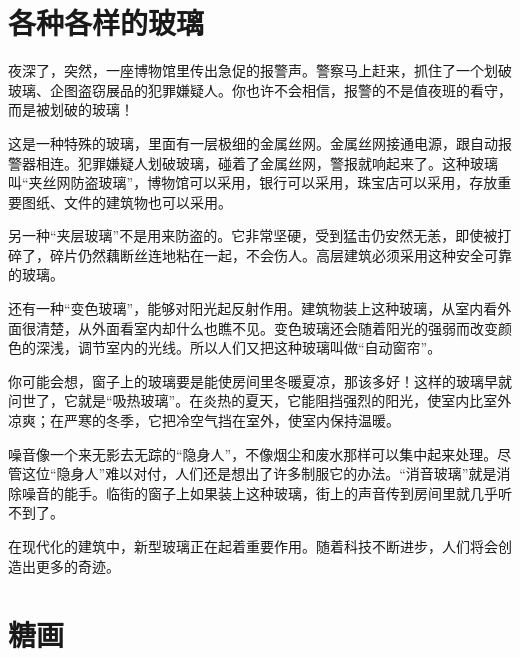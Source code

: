 \documentclass[12pt,UTF-8,openany]{ctexbook}
\begin{document}
\chapter{各种各样的玻璃}

\begin{large}
    
    夜深了，突然，一座博物馆里传出急促的报警声。警察马上赶来，抓住了一个划破玻璃、企图盗窃展品的犯罪嫌疑人。你也许不会相信，报警的不是值夜班的看守，而是被划破的玻璃！
    
    这是一种特殊的玻璃，里面有一层极细的金属丝网。金属丝网接通电源，跟自动报警器相连。犯罪嫌疑人划破玻璃，碰着了金属丝网，警报就响起来了。这种玻璃叫“夹丝网防盗玻璃”，博物馆可以采用，银行可以采用，珠宝店可以采用，存放重要图纸、文件的建筑物也可以采用。
    
    另一种“夹层玻璃”不是用来防盗的。它非常坚硬，受到猛击仍安然无恙，即使被打碎了，碎片仍然藕断丝连地粘在一起，不会伤人。高层建筑必须采用这种安全可靠的玻璃。
    
    还有一种“变色玻璃”，能够对阳光起反射作用。建筑物装上这种玻璃，从室内看外面很清楚，从外面看室内却什么也瞧不见。变色玻璃还会随着阳光的强弱而改变颜色的深浅，调节室内的光线。所以人们又把这种玻璃叫做“自动窗帘”。
    
    你可能会想，窗子上的玻璃要是能使房间里冬暖夏凉，那该多好！这样的玻璃早就问世了，它就是“吸热玻璃”。在炎热的夏天，它能阻挡强烈的阳光，使室内比室外凉爽；在严寒的冬季，它把冷空气挡在室外，使室内保持温暖。
    
    噪音像一个来无影去无踪的“隐身人”，不像烟尘和废水那样可以集中起来处理。尽管这位“隐身人”难以对付，人们还是想出了许多制服它的办法。“消音玻璃”就是消除噪音的能手。临街的窗子上如果装上这种玻璃，街上的声音传到房间里就几乎听不到了。
    
    在现代化的建筑中，新型玻璃正在起着重要作用。随着科技不断进步，人们将会创造出更多的奇迹。
    
\end{large}



\chapter{糖画}
\end{document}
